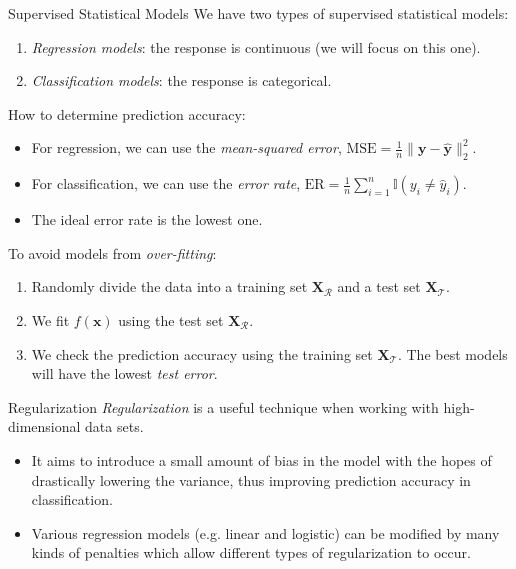 \documentclass[8pt]{beamer}
\newcommand{\mydef}[1]{\textcolor{SteelBlue3}{\textit{#1}}} %
\begin{document}
\begin{frame}{Supervised  Statistical Models}
We have two types of supervised statistical models: 
\begin{enumerate}
    \item \mydef{Regression models}: the response is continuous (we will focus on this one). 
    \item \mydef{Classification models}: the response is categorical.
\end{enumerate}

How to determine prediction accuracy:
\begin{itemize}
    \item For regression, we can use the \mydef{mean-squared error}, $\displaystyle \mathrm{MSE} = \frac{1}{n} \| \mathbf{y} - \hat{\mathbf{y}} \|_2^2$. %
    \item For classification, we can use the \mydef{error rate}, $\displaystyle \mathrm{ER} = \frac{1}{n} \sum_{i=1}^{n} \mathbb{I}(y_i \not= \hat{y}_i)$. %
    \item The ideal error rate is the lowest one.
\end{itemize}

To avoid models from \mydef{over-fitting}: 
\begin{enumerate}
    \item Randomly divide the data into a training set $\mathbf{X}_{\mathcal{R}}$ and a test set $\mathbf{X}_{\mathcal{T}}$. 
    
    \item We fit $f(\bm{x})$ using the test set $\mathbf{X}_{\mathcal{R}}$. 
    \item We check the prediction accuracy using the training set $\mathbf{X}_{\mathcal{T}}$. The best models will have the lowest \mydef{test error}.
\end{enumerate}
\end{frame}

\begin{frame}{Regularization}
\mydef{Regularization} is a useful technique when working with high-dimensional data sets.

\begin{itemize}   
    \item It aims to introduce a small amount of bias in the model with the hopes of drastically lowering the variance, thus improving prediction accuracy in classification.
    
     \item Various regression models (e.g. linear and logistic) can be modified by many kinds of penalties which allow different types of regularization to occur.
\end{itemize}
\end{frame}
\end{document}
